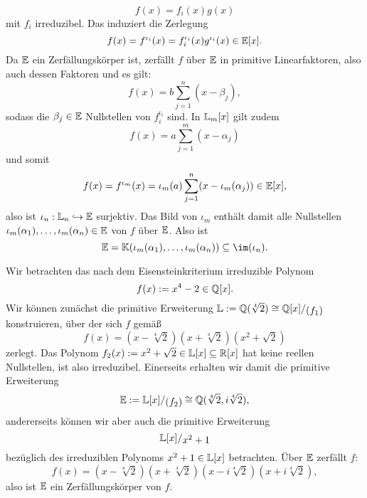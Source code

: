 \begin{beweis}
\begin{equation}
f(x) = f_i(x) g(x)
\end{equation}
mit $f_i$ irreduzibel. Das induziert die Zerlegung
\begin{equation}
f(x) = f^{\iota_i}(x) = f_i^{\iota_i} (x) g^{\iota_i} (x) \in \mathbb{E}[x].
\end{equation}
Da $\mathbb{E}$ ein Zerfällungskörper ist, zerfällt $f$ über $\mathbb{E}$ in primitive Linearfaktoren, also auch dessen Faktoren und es gilt:
\begin{equation}
f(x)= b \sum_{j=1}^n (x-\beta_j), 
\end{equation}
sodass die $\beta_j \in \mathbb{E}$ Nullstellen von $f_i^{\iota_i}$ sind. In $\mathbb{L}_m[x]$ gilt zudem
\begin{equation}
f(x) = a \sum_{j=1}^m (x-\alpha_j)
\end{equation} 
und somit
\begin{equation}
f(x) = f^{\iota_m}(x) = \iota_m(a) \sum_{j=1}^n (x-\iota_m(\alpha_j)) \in \mathbb{E}[x], 
\end{equation}
also ist $\iota_n: \mathbb{L}_n \hookrightarrow \mathbb{E}$ surjektiv. Das Bild von $\iota_m$ enthält damit alle Nullstellen $\iota_m(\alpha_1), \dots, \iota_m(\alpha_n) \in \mathbb{E}$ von $f$ über $\mathbb{E}$. Also ist
\begin{equation}
\E = \K(\iota_m(\alpha_1), \dots, \iota_m(\alpha_n)) \sub \im(\iota_n).
\end{equation} 
\end{beweis}
\begin{beispiel}
Wir betrachten das nach dem Eisensteinkriterium irreduzible Polynom
\begin{equation}
f(x) := x^4-2 \in \mathbb{Q}[x].
\end{equation}
Wir können zunächst die primitive Erweiterung $\L := \Q(\sqrt[4]{2}) \cong \quotient{\Q[x]}{(f_1)}$ konstruieren, über der sich $f$ gemäß
\begin{equation}
f(x) = (x-\sqrt[4]{2})(x+\sqrt[4]{2})(x^2+\sqrt{2})
\end{equation} 
zerlegt. Das Polynom $f_2(x):=x^2+\sqrt{2} \in \mathbb{L}[x] \subseteq \mathbb{R}[x]$ hat keine reellen Nullstellen, ist also irreduzibel. Einerseits erhalten wir damit die primitive Erweiterung
\begin{equation}
\E := \quotient{\L[x]}{(f_2)} \cong \Q(\sqrt[4]{2}, i \sqrt[4]{2}),
\end{equation}
andererseits können wir aber auch die primitive Erweiterung 
\begin{equation}
\quotient{\L[x]}{x^2+1}
\end{equation}
bezüglich des irreduziblen Polynoms $x^2+1 \in \mathbb{L}[x]$ betrachten. Über $\mathbb{E}$ zerfällt $f$:
\begin{equation}
f(x)= (x-\sqrt[4]{2})(x+\sqrt[4]{2})(x-i\sqrt[4]{2})(x+i \sqrt[4]{2}),
\end{equation}
also ist $\mathbb{E}$ ein Zerfällungskörper von $f$. 
\end{beispiel}